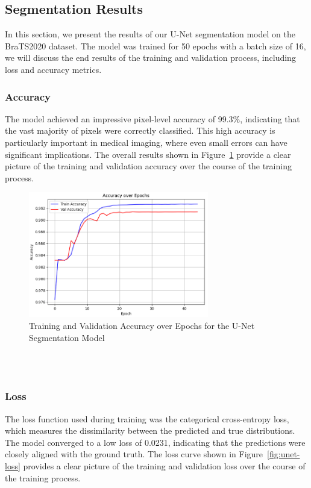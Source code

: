 \subsection{Segmentation Results}
\label{sec:segmentation-results}
In this section, we present the results of our U-Net segmentation model on the BraTS2020 dataset. The model was trained for 50 epochs with a batch size of 16, we will discuss the end results of the training and validation process, including loss and accuracy metrics.

\subsubsection{Accuracy}
The model achieved an impressive pixel-level accuracy of 99.3\%, indicating that the vast majority of pixels were correctly classified. This high accuracy is particularly important in medical imaging, where even small errors can have significant implications. The overall results shown in Figure~\ref{fig:unet-acc} provide a clear picture of the training and validation accuracy over the course of the training process.
\begin{figure}[ht]
  \centering
  \includegraphics[width=0.7\textwidth]{Images/Chapter3/unet_acc.png}
  \caption{Training and Validation Accuracy over Epochs for the U-Net Segmentation Model}
  \label{fig:unet-acc}
\end{figure}
\\
\\
\subsubsection{Loss}
The loss function used during training was the categorical cross-entropy loss, which measures the dissimilarity between the predicted and true distributions. The model converged to a low loss of 0.0231, indicating that the predictions were closely aligned with the ground truth. The loss curve shown in Figure~\ref{fig:unet-loss} provides a clear picture of the training and validation loss over the course of the training process.

